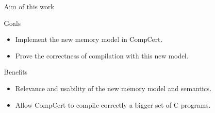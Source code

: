 \begin{frame}{Aim of this work}
  
  \begin{block}{Goals}
    \begin{itemize}
    \item Implement the new memory model in CompCert.
    \item Prove the correctness of compilation with this new model.
    \end{itemize}
  \end{block}
  \vfill
  \begin{exampleblock}{Benefits}
    \begin{itemize}
    \item Relevance and usability of the new memory model and semantics.
    \item Allow CompCert to compile correctly a bigger set of C programs.
    \end{itemize}
  \end{exampleblock}

\end{frame}
